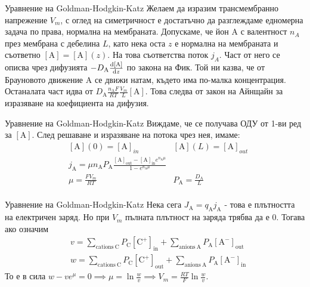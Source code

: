 \begin{frame}[t]{Уравнение на Goldman-Hodgkin-Katz}
    Желаем да изразим трансмембранно напрежение $V_m$, с оглед на симетричност е достатъчно да разглеждаме едномерна задача по права, нормална на мембраната.
    Допускаме, че йон $\mathrm{A}$ с валентност $n_A$ през мембрана с дебелина $L$, като нека оста $z$ е нормална на мембраната и съответно $\left[\mathrm{A}\right]=\left[\mathrm{A}\right](z)$. 
    На това съответства поток $j_A$. Част от него се описва чрез дифузията $-D_{\mathrm{A}}\dv{\left[{\mathrm{A}}\right]}{z}$ по закона на Фик.
    Той ни казва, че от Брауновото движение $\mathrm{A}$ се движи натам, където има по-малка концентрация.
    Останалата част идва от $D_{\mathrm{A}}\frac{n_{\mathrm{A}}F}{RT}\frac{V_m}{L}\left[\mathrm{A}\right]$. 
    Това следва от закон на Айнщайн за изразяване на коефициента на дифузия.
\end{frame}   

\begin{frame}[t]{Уравнение на Goldman-Hodgkin-Katz}
    Виждаме, че се получава ОДУ от 1-ви ред за $\left[\mathrm{A}\right]$. След решаване и изразяване на потока чрез нея, имаме:
    \begin{align*}
        &\left[\mathrm{A}\right](0) = \left[\mathrm{A}\right]_{in} &\left[\mathrm{A}\right](L) = \left[\mathrm{A}\right]_{out} \\
        &j_{\mathrm {A}}=\mu n_{\mathrm {A}}P_{\mathrm{A}}{\frac{\left[\mathrm{A}\right]_{\mathrm {out}}-\left[\mathrm {A}\right]_{\mathrm{in}}e^{n_{\mathrm {A}}\mu}}{1-e^{n_{\mathrm {A}}\mu}}} \\
        &\mu=\frac{FV_m}{RT} &P_{\mathrm{A}}=\frac{D_{\mathrm {A}}}{L}\\
    \end{align*}
\end{frame}

\begin{frame}[t]{Уравнение на Goldman-Hodgkin-Katz}
    Нека сега $J_{\mathrm{A}}=q_{\mathrm{A}}j_{\mathrm{A}}$ - това е плътността на електричен заряд.
    Но при $V_m$ пълната плътност на заряда трябва да е 0. Тогава ако означим 
    \begin{align*}
        &v=\sum_{{{\mathrm{cations\ C}}}}P_{{{\mathrm{C}}}}\left[{\mathrm{C}}^{{+}}\right]_{{{\mathrm{in}}}}+\sum_{{{\mathrm{anions\ A}}}}P_{{{\mathrm{A}}}}\left[{\mathrm{A}}^{{-}}\right]_{{{\mathrm{out}}}} \\
        &w=\sum_{{{\mathrm{cations\ C}}}}P_{{{\mathrm{C}}}}\left[{\mathrm{C}}^{{+}}\right]_{{{\mathrm{out}}}}+\sum_{{{\mathrm{anions\ A}}}}P_{{{\mathrm{A}}}}\left[{\mathrm{A}}^{{-}}\right]_{{{\mathrm{in}}}} 
    \end{align*}
    То е в сила $w - v e^\mu = 0 \implies \mu = \ln \frac{w}{v} \implies V_m = \frac{RT}{F} \ln \frac{w}{v}$. 
\end{frame}